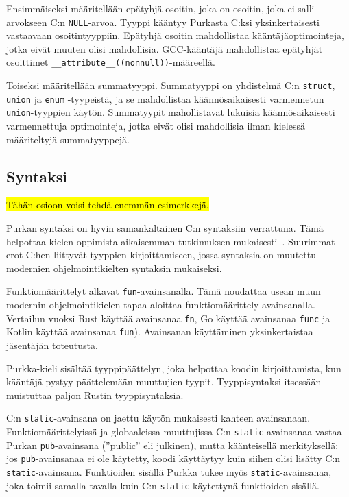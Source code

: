 Ensimmäiseksi määritellään epätyhjä osoitin, joka on osoitin, joka ei salli
arvokseen C:n \texttt{NULL}-arvoa. Tyyppi kääntyy Purkasta C:ksi
yksinkertaisesti vastaavaan osoitintyyppiin. Epätyhjä osoitin mahdollistaa
kääntäjäoptimointeja, jotka eivät muuten olisi mahdollisia. GCC-kääntäjä
mahdollistaa epätyhjät osoittimet
\texttt{\_\_attribute\_\_((nonnull))}-määreellä.

Toiseksi määritellään summatyyppi. Summatyyppi on yhdistelmä C:n
\texttt{struct}, \texttt{union} ja \texttt{enum} -tyypeistä, ja se mahdollistaa
käännösaikaisesti varmennetun \texttt{union}-tyyppien käytön. Summatyypit
mahollistavat lukuisia käännösaikaisesti varmennettuja optimointeja, jotka
eivät olisi mahdollisia ilman kielessä määriteltyjä
summatyyppejä.\citationneeded

\subsection{Syntaksi}

\hl{Tähän osioon voisi tehdä enemmän esimerkkejä.}

Purkan syntaksi on hyvin samankaltainen C:n syntaksiin verrattuna. Tämä helpottaa
kielen oppimista aikaisemman tutkimuksen mukaisesti~\citep{languagelearning}.
Suurimmat erot C:hen liittyvät tyyppien kirjoittamiseen, jossa syntaksia on
muutettu modernien ohjelmointikielten syntaksin mukaiseksi.

Funktiomäärittelyt alkavat \texttt{fun}-avainsanalla. Tämä noudattaa usean muun
modernin ohjelmointikielen tapaa aloittaa funktiomäärittely avainsanalla.
Vertailun vuoksi Rust käyttää avainsanaa \texttt{fn}, Go käyttää avainsanaa
\texttt{func} ja Kotlin käyttää avainsanaa \texttt{fun}). Avainsanan
käyttäminen yksinkertaistaa jäsentäjän toteutusta.

Purkka-kieli sisältää tyyppipäättelyn, joka helpottaa koodin kirjoittamista,
kun kääntäjä pystyy päättelemään muuttujien tyypit. Tyyppisyntaksi itsessään
muistuttaa paljon Rustin tyyppisyntaksia.

C:n \texttt{static}-avainsana on jaettu käytön mukaisesti kahteen avainsanaan.
Funktiomäärittelyissä ja globaaleissa muuttujissa C:n
\texttt{static}-avainsanaa vastaa Purkan \texttt{pub}-avainsana (''public'' eli
julkinen), mutta käänteisellä merkityksellä: jos \texttt{pub}-avainsanaa ei ole
käytetty, koodi käyttäytyy kuin siihen olisi lisätty C:n
\texttt{static}-avainsana. Funktioiden sisällä Purkka tukee myös
\texttt{static}-avainsanaa, joka toimii samalla tavalla kuin C:n
\texttt{static} käytettynä funktioiden sisällä.

